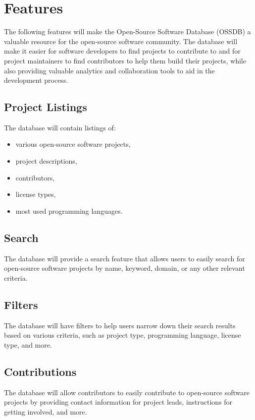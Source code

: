 \pagebreak
\section{Features}
The following features will make the Open-Source Software Database (OSSDB) a valuable
resource for the open-source software community.
The database will make it easier for software developers to find projects to
contribute to and for project maintainers to find contributors to help them build their
projects, while also providing valuable analytics and collaboration tools to aid
in the development process.


\subsection{Project Listings}
    The database will contain listings of:
    \begin{itemize}
        \item various open-source software projects,
        \item project descriptions,
        \item contributors,
        \item license types,
        \item most used programming languages.
    \end{itemize}

\subsection{Search}
The database will provide a search feature that allows users to easily search for open-source
software projects by name, keyword, domain, or any other relevant criteria.

\subsection{Filters}
The database will have filters to help users narrow down their search results based on
various criteria, such as project type, programming language, license type, and more.

\subsection{Contributions}
The database will allow contributors to easily contribute to open-source software projects
by providing contact information for project leads, instructions for getting involved, and more.

